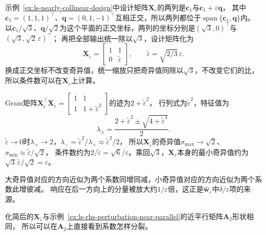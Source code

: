\begin{example}[近共线设计的奇异值]
\label{ex:ls-nearly-collinear-singular-values}
示例~\ref{ex:ls-nearly-collinear-design}中设计矩阵$\bm X_\varepsilon$的两列是$\bm c_1$与$\bm c_1+\varepsilon\bm q$，
其中$\bm c_1=(1,1,1)^\top$、$\bm q=(0,1,-1)^\top$互相正交，所以两列都位于$\operatorname{span}\{\bm c_1,\bm q\}$内。
以$\bm c_1/\sqrt3$、$\bm q/\sqrt2$为这个平面的正交坐标，两列的坐标分别是$(\sqrt3,0)^\top$与$(\sqrt3,\sqrt2\,\varepsilon)^\top$；
再把全部输出统一除以$\sqrt3$，设计矩阵化为
\begin{equation}
 \bm X_{\widetilde\varepsilon}
 =\begin{bmatrix}1&1\\0&\widetilde\varepsilon\end{bmatrix},
 \qquad \widetilde\varepsilon=\sqrt{2/3}\,\varepsilon .
 \label{eq:matrix-analysis-nearly-collinear-design}
\end{equation}
换成正交坐标不改变奇异值，统一缩放只把奇异值同除以$\sqrt3$，不改变它们的比，所以条件数可以在$\bm X_{\widetilde\varepsilon}$上计算。

Gram矩阵$\bm X_{\widetilde\varepsilon}^\top\bm X_{\widetilde\varepsilon}=\left[\begin{smallmatrix}1&1\\1&1+\widetilde\varepsilon^2\end{smallmatrix}\right]$的迹为$2+\widetilde\varepsilon^2$，
行列式为$\widetilde\varepsilon^2$，特征值为
\begin{equation}
 \lambda_\pm
 =\frac{2+\widetilde\varepsilon^2
          \mathbin{\pm}\sqrt{4+\widetilde\varepsilon^4}}{2}.
 \label{eq:matrix-analysis-nearly-collinear-gram-eigenvalues}
\end{equation}
$\widetilde\varepsilon\to0$时$\lambda_+\to2$，$\lambda_-=\widetilde\varepsilon^2/\lambda_+\approx\widetilde\varepsilon^2/2$，
所以$\bm X_{\widetilde\varepsilon}$的奇异值$\sigma_{\max}\to\sqrt2$、$\sigma_{\min}\approx\widetilde\varepsilon/\sqrt2$，
条件数约为$2/\widetilde\varepsilon=\sqrt6/\varepsilon$。乘回$\sqrt3$，$\bm X_\varepsilon$本身的最小奇异值约为$\sqrt3\,\widetilde\varepsilon/\sqrt2=\varepsilon$。
\end{example}

大奇异值对应的方向近似为两个系数同增同减，小奇异值对应的方向近似为两个系数此增彼减。
响应在后一方向上的分量被放大约$1/\varepsilon$倍，这正是$\hat{\bm w}_\varepsilon$中$\delta/\varepsilon$项的来源。

化简后的$\bm X_{\widetilde\varepsilon}$与示例~\ref{ex:ls-rhs-perturbation-near-parallel}的近平行矩阵$\bm A_2$形状相同，
所以可以在$\bm A_2$上直接看到系数怎样分裂。

